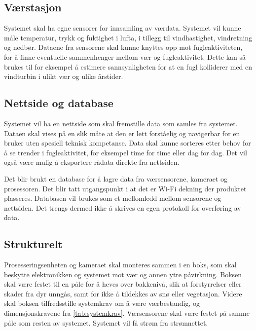\subsection{Værstasjon}\label{sec:design:vaerstasjon}
Systemet skal ha egne sensorer for innsamling av værdata. 
Systemet vil kunne måle temperatur, trykk og fuktighet i lufta, i tillegg til vindhastighet, vindretning og nedbør.
Dataene fra sensorene skal kunne knyttes opp mot fugleaktiviteten, for å finne eventuelle sammenhenger mellom vær og fugleaktivitet. 
Dette kan så brukes til for eksempel å estimere sannsynligheten for at en fugl kolliderer med en vindturbin i ulikt vær og ulike årstider.

\subsection{Nettside og database}\label{sec:design:nettside}

Systemet vil ha en nettside som skal fremstille data som samles fra systemet. 
Dataen skal vises på en slik måte at den er lett forståelig og navigerbar for en bruker uten spesiell teknisk kompetanse. 
Data skal kunne sorteres etter behov for å se trender i fugleaktivitet, for eksempel time for time eller dag for dag. 
Det vil også være mulig å eksportere rådata direkte fra nettsiden. 

Det blir brukt en database for å lagre data fra værsensorene, kameraet og prosessoren. Det blir tatt utgangspunkt i at det er Wi-Fi dekning der produktet plasseres. Databasen vil brukes som et mellomledd mellom sensorene og nettsiden. Det trengs dermed ikke å skrives en egen protokoll for overføring av data.

\subsection{Strukturelt}\label{sec:design:strukturelt}

Prosesseringsenheten og kameraet skal monteres sammen i en boks, som skal beskytte elektronikken og systemet mot vær og annen ytre påvirkning. 
Boksen skal være festet til en påle for å heves over bakkenivå, slik at forstyrrelser eller skader fra dyr unngås, samt for ikke å tildekkes av snø eller vegetasjon.
Videre skal boksen tilfredsstille systemkrav  om å være værbestandig, og dimensjonskravene  fra \autoref{tab:systemkrav}. 
Værsensorene skal være festet på samme påle som resten av systemet. 
Systemet vil få strøm fra strømnettet.



